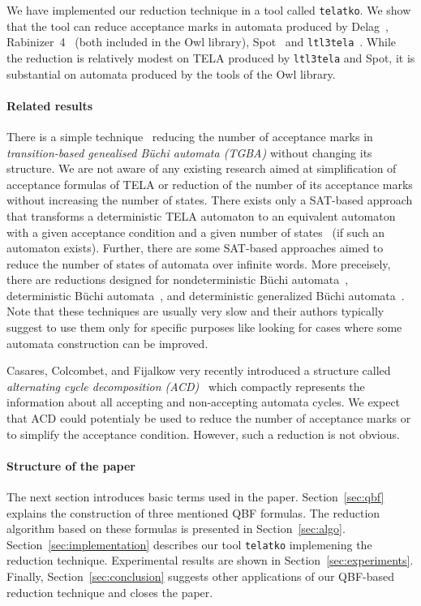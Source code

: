 \documentclass[runningheads]{llncs}
\newcommand{\telatko}{\texttt{telatko}\xspace}
\begin{document}
We have implemented our reduction technique in a tool called
\telatko. We show that the tool can reduce acceptance marks in
automata produced by Delag~\cite{muller.17.gandalf},
Rabinizer~4~\cite{kretinsky.18.cav} (both included in the Owl
library), Spot~\cite{duret.16.atva2} and
\texttt{ltl3tela}~\cite{major.19.atva}.  While the reduction is
relatively modest on TELA produced by \texttt{ltl3tela} and Spot, it
is substantial on automata produced by the tools of the Owl library.

\paragraph*{Related results}
There is a simple technique~\cite{babiak.13.spin} reducing the number
of acceptance marks in \emph{transition-based genealised Büchi
  automata (TGBA)} without changing its structure. We are not aware
of any existing research aimed at simplification of acceptance
formulas of TELA or reduction of the number of its acceptance marks
without increasing the number of states. There exists only a SAT-based
approach that transforms a deterministic TELA automaton to an
equivalent automaton with a given acceptance condition and a given
number of states~\cite{baarir.15.lpar} (if such an automaton
exists). Further, there are some SAT-based approaches aimed to reduce
the number of states of automata over infinite words. More preceisely,
there are reductions designed for nondeterministic Büchi
automata~\cite{ehlers.10.spin}, deterministic Büchi
automata~\cite{ehlers.10.sat}, and deterministic generalized Büchi
automata~\cite{baarir.14.forte}. Note that these techniques are
usually very slow and their authors typically suggest to use them only
for specific purposes like looking for cases where some automata
construction can be improved.

Casares, Colcombet, and Fijalkow very recently introduced a structure
called \emph{alternating cycle decomposition
  (ACD)}~\cite{casares.21.icalp} which compactly represents the
information about all accepting and non-accepting automata cycles. We
expect that ACD could potentialy be used to reduce the number of
acceptance marks or to simplify the acceptance condition. However,
such a reduction is not obvious.

\paragraph*{Structure of the paper} The next section introduces basic
terms used in the paper. Section~\ref{sec:qbf} explains the
construction of three mentioned QBF formulas. The reduction algorithm
based on these formulas is presented in
Section~\ref{sec:algo}. Section~\ref{sec:implementation} describes our
tool \telatko implemening the reduction technique.
Experimental results are shown in
Section~\ref{sec:experiments}. Finally, Section~\ref{sec:conclusion}
suggests other applications of our QBF-based reduction technique and
closes the paper.
\end{document}
